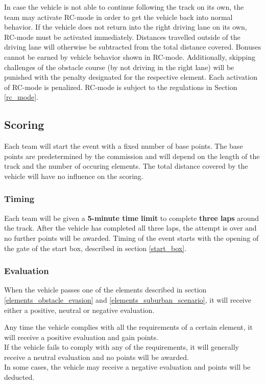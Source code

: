 In case the vehicle is not able to continue following the track on its own, the
team may activate RC-mode in order to get the vehicle back into normal
behavior. If the vehicle does not return into the right driving lane on its
own, RC-mode must be activated immediately. Distances travelled outside of the
driving lane will otherwise be subtracted from the total distance covered.
Bonuses cannot be earned by vehicle behavior shown in RC-mode. Additionally,
skipping challenges of the obstacle course (by not driving in the right lane)
will be punished with the penalty designated for the respective element. Each
activation of RC-mode is penalized. RC-mode is subject to the regulations in
Section \ref{rc_mode}.

\subsection{Scoring}{
	\label{obstacle_scoring}

	\renewcommand*\footnoterule{} %
	\newcommand{\topstrut}{\rule{0pt}{3.5ex}}

	Each team will start the event with a fixed number of base points. The base
	points are predetermined by the commission and will depend on the length of the
	track and the number of occuring elements. The total distance covered by the
	vehicle will have no influence on the scoring.

	\subsubsection{Timing}
	Each team will be given a \textbf{5-minute time limit} to complete
	\textbf{three laps} around the track. After the vehicle has completed all three
	laps, the attempt is over and no further points will be awarded. Timing of the
	event starts with the opening of the gate of the start box, described in
	section \ref{start_box}.

	\subsubsection{Evaluation}
	When the vehicle passes one of the elements described in section
	\ref{elements_obstacle_evasion} and \ref{elements_suburban_scenario}, it will
	receive either a positive, neutral or negative evaluation.

	Any time the vehicle complies with all the requirements of a certain element,
	it will receive a positive evaluation and gain points.\\ If the vehicle fails
	to comply with any of the requirements, it will generally receive a neutral
	evaluation and no points will be awarded.\\ In some cases, the vehicle may
	receive a negative evaluation and points will be deducted.

}
